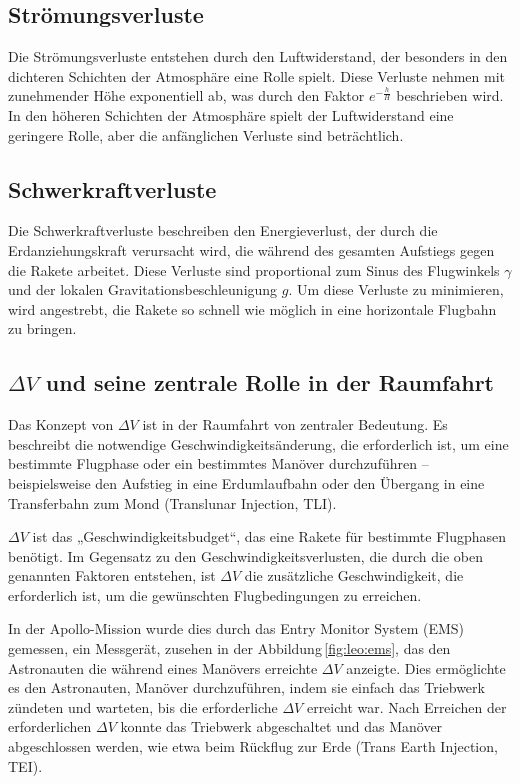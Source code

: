 \subsection{Strömungsverluste}
Die Strömungsverluste entstehen durch den Luftwiderstand, der besonders in den dichteren Schichten der Atmosphäre eine Rolle spielt. 
Diese Verluste nehmen mit zunehmender Höhe exponentiell ab, was durch den Faktor \(e^{-\frac{h}{H}}\) beschrieben wird. 
In den höheren Schichten der Atmosphäre spielt der Luftwiderstand eine geringere Rolle, aber die anfänglichen Verluste sind beträchtlich.

\subsection{Schwerkraftverluste}
Die Schwerkraftverluste beschreiben den Energieverlust, der durch die Erdanziehungskraft verursacht wird, die während des gesamten Aufstiegs gegen die Rakete arbeitet. 
Diese Verluste sind proportional zum Sinus des Flugwinkels \(\gamma\) und der lokalen Gravitationsbeschleunigung \(g\). 
Um diese Verluste zu minimieren, wird angestrebt, die Rakete so schnell wie möglich in eine horizontale Flugbahn zu bringen.

\subsection{\(\Delta V\) und seine zentrale Rolle in der Raumfahrt}
Das Konzept von \(\Delta V\) ist in der Raumfahrt von zentraler Bedeutung. 
Es beschreibt die notwendige Geschwindigkeitsänderung, die erforderlich ist, um eine bestimmte Flugphase oder ein bestimmtes Manöver durchzuführen – beispielsweise den Aufstieg in eine Erdumlaufbahn oder den Übergang in eine Transferbahn zum Mond (Translunar Injection, TLI).

\(\Delta V\) ist das „Geschwindigkeitsbudget“, das eine Rakete für bestimmte Flugphasen benötigt. 
Im Gegensatz zu den Geschwindigkeitsverlusten, die durch die oben genannten Faktoren entstehen, ist \(\Delta V\) die zusätzliche Geschwindigkeit, die erforderlich ist, um die gewünschten Flugbedingungen zu erreichen.

In der Apollo-Mission wurde dies durch das Entry Monitor System (EMS) gemessen, ein Messgerät, zusehen in der Abbildung\,\ref{fig:leo:ems}, das den Astronauten die während eines Manövers erreichte \(\Delta V\) anzeigte. 
Dies ermöglichte es den Astronauten, Manöver durchzuführen, indem sie einfach das Triebwerk zündeten und warteten, bis die erforderliche \(\Delta V\) erreicht war. 
Nach Erreichen der erforderlichen \(\Delta V\) konnte das Triebwerk abgeschaltet und das Manöver abgeschlossen werden, wie etwa beim Rückflug zur Erde (Trans Earth Injection, TEI).


